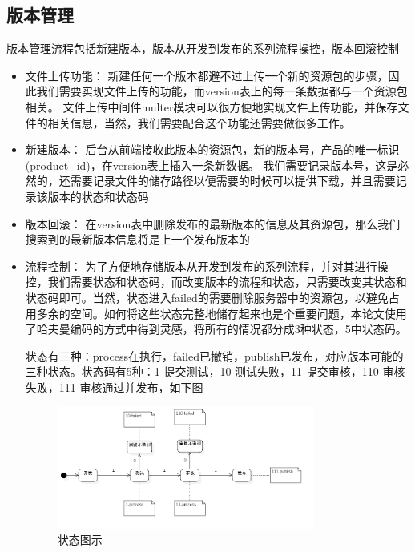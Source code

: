 \subsection{版本管理}
\label{version_manage} 
		版本管理流程包括新建版本，版本从开发到发布的系列流程操控，版本回滚控制
		\begin{itemize}
			\item 文件上传功能：
			新建任何一个版本都避不过上传一个新的资源包的步骤，因此我们需要实现文件上传的功能，而version表上的每一条数据都与一个资源包相关。
			文件上传中间件multer模块\cite{multer}可以很方便地实现文件上传功能，并保存文件的相关信息，当然，我们需要配合这个功能还需要做很多工作。
			\item 新建版本：
			后台从前端接收此版本的资源包，新的版本号，产品的唯一标识(product\_id)，在version表上插入一条新数据。
			我们需要记录版本号，这是必然的，还需要记录文件的储存路径以便需要的时候可以提供下载，并且需要记录该版本的状态和状态码
			\item 版本回滚：
			在version表中删除发布的最新版本的信息及其资源包，那么我们搜索到的最新版本信息将是上一个发布版本的
			\item 流程控制：
			为了方便地存储版本从开发到发布的系列流程，并对其进行操控，我们需要状态和状态码，而改变版本的流程和状态，只需要改变其状态和状态码即可。当然，状态进入failed的需要删除服务器中的资源包，以避免占用多余的空间。如何将这些状态完整地储存起来也是个重要问题，本论文使用了哈夫曼编码的方式中得到灵感，将所有的情况都分成3种状态，5中状态码。
			
			状态有三种：process在执行，failed已撤销，publish已发布，对应版本可能的三种状态。状态码有5种：1-提交测试，10-测试失败，11-提交审核，110-审核失败，111-审核通过并发布，如下图
			\begin{figure}[h]
				\centering
				\includegraphics[width=0.8\textwidth]{image/UML/StatechartDiagram.png}
				\caption{状态图示}
				\label{fig:status}
			\end{figure}
		\end{itemize}
			
			
			
			